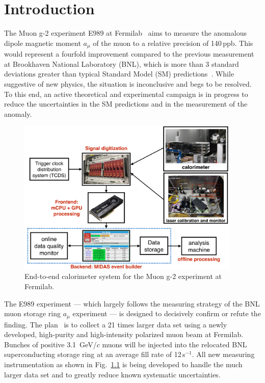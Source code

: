 \chapter{Introduction}
\label{chap:intro}

The Muon g-2 experiment E989 at Fermilab~\cite{Grange2015} aims to measure
the anomalous dipole magnetic moment $a_{\mu}$ of the muon
to a relative precision of 140\,ppb.  This would represent a fourfold improvement compared to the previous measurement~\cite{Bennett2006} at Brookhaven National Laboratory (BNL), which is more than 3 standard deviations greater than typical Standard Model (SM) predictions~\cite{Davier2010,Hagiwara2011}.  While suggestive of new physics, the situation is inconclusive and begs to be resolved.  To this end, an active theoretical and experimental campaign is in progress to reduce the uncertainties in the SM predictions and in the measurement of the anomaly.

\begin{figure}[htbp]
\centering
\includegraphics[width=0.95\textwidth]{pics/FullCaloSystem.pdf}
\caption{End-to-end calorimeter system for the Muon g-2 experiment at Fermilab.}
\label{fig:endtoendsystem}
\end{figure}

The E989 experiment --- which largely follows the measuring strategy of the BNL muon storage ring $a_{\mu}$ experiment --- is designed to decisively confirm or refute the finding.  The plan~\cite{Grange2015} is to collect a 21 times larger data set using a newly developed, high-purity and high-intensity polarized muon beam at Fermilab. Bunches of positive 3.1~GeV/$c$ muons will be injected into the relocated BNL superconducting storage ring at an average fill rate of 12\,s$^{-1}$.  All new measuring instrumentation as shown in Fig.~\ref{fig:endtoendsystem} is being developed to handle the much larger data set and to greatly reduce known systematic uncertainties.

